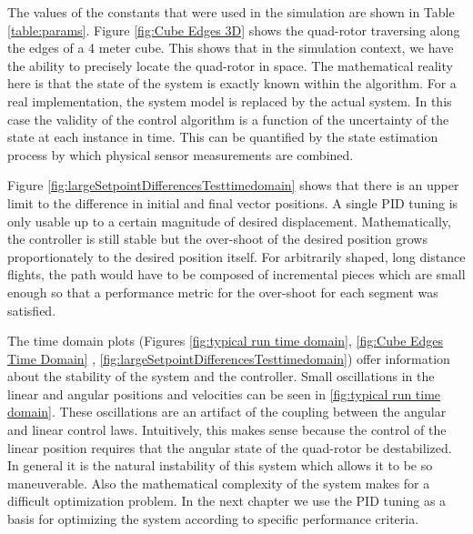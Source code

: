 The values of the constants that were used in the simulation are shown in Table \ref{table:params}. Figure \ref{fig:Cube Edges 3D} shows the quad-rotor traversing along the edges of a 4 meter cube. This shows that in the simulation context, we have the ability to precisely locate the quad-rotor in space. The mathematical reality here is that the state of the system is exactly known within the algorithm. For a real implementation, the system model is replaced by the actual system. In this case the validity of the control algorithm is a function of the uncertainty of the state at each instance in time. This can be quantified by the state estimation process by which physical sensor measurements are combined. 

Figure \ref{fig:largeSetpointDifferencesTesttimedomain} shows that there is an upper limit to the difference in initial and final vector positions. A single PID tuning is only usable up to a certain magnitude of desired displacement. Mathematically, the controller is still stable but the over-shoot of the desired position grows proportionately to the desired position itself. For arbitrarily shaped, long distance flights, the path would have to be composed of incremental pieces which are small enough so that a performance metric for the over-shoot for each segment was satisfied.

The time domain plots (Figures     \ref{fig:typical run time domain},   \ref{fig:Cube Edges Time Domain}  , \ref{fig:largeSetpointDifferencesTesttimedomain}) offer information about the stability of the system and the controller. Small oscillations in the linear and angular positions and velocities can be seen in \ref{fig:typical run time domain}. These oscillations are an artifact of the coupling between the angular and linear control laws. Intuitively, this makes sense because the control of the linear position requires that the angular state of the quad-rotor be destabilized. In general it is the natural instability of this system which allows it to be so maneuverable. Also the mathematical complexity of the system makes for a difficult optimization problem. In the next chapter we use the PID tuning as a basis for optimizing the system according to specific performance criteria.

